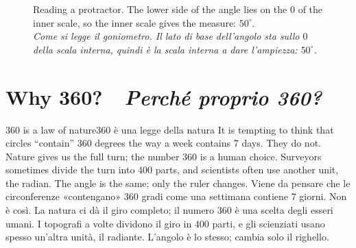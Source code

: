 \documentclass[10pt,a4paper,oneside]{book}
\newcommand{\bisection}[2]{%
  \Needspace{7\baselineskip}%
  \section[#1 \textperiodcentered\ #2]{#1 {\color{itgreen}\itshape\,\textperiodcentered\ #2}}}
\newcommand{\bicap}[2]{\caption{#1\\{\color{itgreen}\itshape #2}}}
\begin{document}
\begin{figure}[htbp]
\centering
\bicap{Reading a protractor. The lower side of the angle lies on the $0$ of the inner scale, so the inner scale gives the measure: $50^\circ$.}%
      {Come si legge il goniometro. Il lato di base dell'angolo sta sullo $0$ della scala interna, quindi è la scala interna a dare l'ampiezza: $50^\circ$.}
\label{fig:protractor}
\end{figure}

\bisection{Why 360?}{Perché proprio 360?}\label{sec:why360}
\begin{trap}{360 is a law of nature}{360 è una legge della natura}
It is tempting to think that circles ``contain'' 360 degrees the way a week contains 7 days. They do not. Nature gives us the full turn; the number 360 is a human choice. Surveyors sometimes divide the turn into 400 parts, and scientists often use another unit, the radian. The angle is the same; only the ruler changes.
\tcblower
Viene da pensare che le circonferenze «contengano» 360 gradi come una settimana contiene 7 giorni. Non è così. La natura ci dà il giro completo; il numero 360 è una scelta degli esseri umani. I topografi a volte dividono il giro in 400 parti, e gli scienziati usano spesso un'altra unità, il radiante. L'angolo è lo stesso; cambia solo il righello.
\end{trap}
\end{document}
